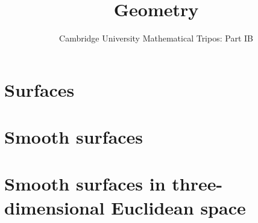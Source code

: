 \documentclass{article}
\title{Geometry}
\author{Cambridge University Mathematical Tripos: Part IB}
\begin{document}
\maketitle

\tableofcontentsnewpage{}

\section{Surfaces}

\section{Smooth surfaces}

\section{Smooth surfaces in three-dimensional Euclidean space}

\end{document}
